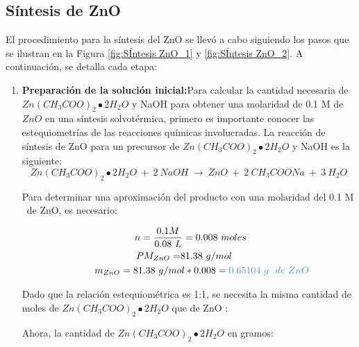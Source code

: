 \documentclass[12pt]{article}
\begin{document}
      \subsection{Síntesis de ZnO }
    El procedimiento para la síntesis del ZnO se llevó a cabo siguiendo los pasos que se ilustran en la Figura \ref{fig:SÍntesis ZnO_1} y \ref{fig:SÍntesis ZnO_2}. A continuación, se detalla cada etapa:



    \begin{enumerate}
        \item\textbf{Preparación de la solución inicial:}Para calcular la cantidad necesaria de $\displaystyle Zn( CH_{3} COO)_{2} \smblkcircle 2H_{2} O$ y NaOH para obtener una molaridad de 0.1 M de $\displaystyle ZnO$ en una síntesis solvotérmica, primero es importante conocer las estequiometrías de las reacciones químicas involucradas. La reacción de síntesis de ZnO para un precursor de $\displaystyle Zn(CH_{3} COO)_{2} \smblkcircle 2H_{2} O$ y NaOH es la siguiente:        
        \begin{equation}
        Zn( CH_{3} COO)_{2} \smblkcircle 2H_{2} O\ +\ 2\ NaOH\ \rightarrow \ ZnO\ +\ 2\ CH_{3} COONa\ +\ 3\ H_{2} O
        \label{eq:ecuZnO}
        \end{equation}

        Para determinar una aproximación del producto con una molaridad del 0.1 M \ de ZnO, es necesario:

        \begin{gather}
        \ n=\frac{0.1M}{0.08\ L} =0.008\ moles\\
        \ {\displaystyle PM_{ZnO} =} 81.38\ g/mol\ \ \ \ \\
        \ \ \ \ \ \ \ \ {\displaystyle m_{ZnO} =81.38\ g/mol*0.008=\textcolor[rgb]{0.29,0.56,0.89}{0.65104\ g\ \ de\ ZnO}}
        \end{gather}
        
        
        Dado que la relación estequiométrica es 1:1, se necesita la misma cantidad de moles de $\displaystyle Zn( CH_{3} COO)_{2} \smblkcircle 2H_{2} O$ que de ZnO :
    
    
        
        Ahora, la cantidad de $\displaystyle Zn( CH_{3} COO)_{2} \smblkcircle 2H_{2} O$ en gramos:
    


\end{enumerate}
\end{document}

